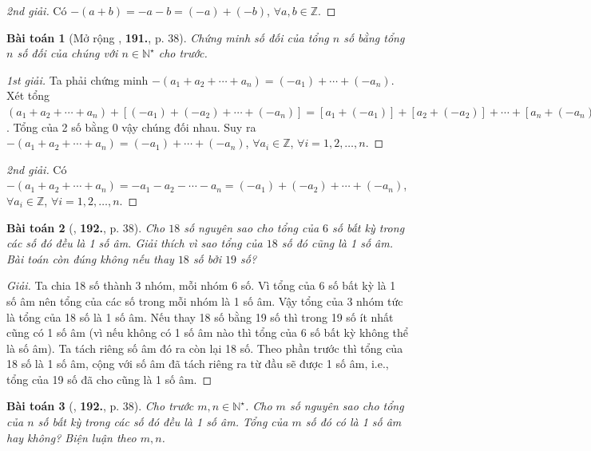 \documentclass{article}
\numberwithin{equation}{section}
\newtheorem{baitoan}{Bài toán}
\begin{document}
\begin{proof}[2nd giải]
	Có $-(a + b) = -a - b = (-a) + (-b)$, $\forall a,b\in\mathbb{Z}$.
\end{proof}

\begin{baitoan}[Mở rộng \cite{Tuyen_Toan_6}, \textbf{191.}, p. 38]
	Chứng minh số đối của tổng $n$ số bằng tổng $n$ số đối của chúng với $n\in\mathbb{N}^\star$ cho trước.
\end{baitoan}

\begin{proof}[1st giải]
	Ta phải chứng minh $-(a_1 + a_2 + \cdots + a_n) = (-a_1) + \cdots + (-a_n)$. Xét tổng $(a_1 + a_2 + \cdots + a_n) + [(-a_1) + (-a_2) + \cdots + (-a_n)] = [a_1 + (-a_1)] + [a_2 + (-a_2)] + \cdots + [a_n + (-a_n)] = 0 + 0 + \cdots + 0 = 0$. Tổng của 2 số bằng 0 vậy chúng đối nhau. Suy ra $-(a_1 + a_2 + \cdots + a_n) = (-a_1) + \cdots + (-a_n)$, $\forall a_i\in\mathbb{Z}$, $\forall i = 1,2,\ldots,n$.
\end{proof}

\begin{proof}[2nd giải]
	Có $-(a_1 + a_2 + \cdots + a_n) = -a_1 - a_2 - \cdots - a_n = (-a_1) + (-a_2) + \cdots + (-a_n)$, $\forall a_i\in\mathbb{Z}$, $\forall i = 1,2,\ldots,n$.
\end{proof}

\begin{baitoan}[\cite{Tuyen_Toan_6}, \textbf{192.}, p. 38]
	Cho $18$ số nguyên sao cho tổng của $6$ số bất kỳ trong các số đó đều là 1 số âm. Giải thích vì sao tổng của $18$ số đó cũng là 1 số âm. Bài toán còn đúng không nếu thay $18$ số bởi $19$ số?
\end{baitoan}

\begin{proof}[Giải]
	Ta chia 18 số thành 3 nhóm, mỗi nhóm 6 số. Vì tổng của 6 số bất kỳ là 1 số âm nên tổng của các số trong mỗi nhóm là 1 số âm. Vậy tổng của 3 nhóm tức là tổng của 18 số là 1 số âm. Nếu thay 18 số bằng 19 số thì trong 19 số ít nhất cũng có 1 số âm (vì nếu không có 1 số âm nào thì tổng của 6 số bất kỳ không thể là số âm). Ta tách riêng số âm đó ra còn lại 18 số. Theo phần trước thì tổng của 18 số là 1 số âm, cộng với số âm đã tách riêng ra từ đầu sẽ được 1 số âm, i.e., tổng của 19 số đã cho cũng là 1 số âm.
\end{proof}

\begin{baitoan}[\cite{Tuyen_Toan_6}, \textbf{192.}, p. 38]
	Cho trước $m,n\in\mathbb{N}^\star$. Cho $m$ số nguyên sao cho tổng của $n$ số bất kỳ trong các số đó đều là 1 số âm. Tổng của $m$ số đó có là 1 số âm hay không? Biện luận theo $m,n$.
\end{baitoan}
\end{document}
